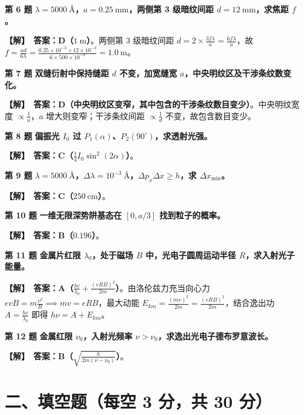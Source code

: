 \documentclass[zihao=5,a4paper,UTF8]{ctexart}
\newenvironment{prob}[2]{%
    \par\vspace{5pt}\noindent\textbf{\color{navy}#1} \textbf{#2}\par\nopagebreak\vspace{2pt}%
}{%
    \par\vspace{3pt}%
}
\newcommand{\sol}{\noindent\textbf{\color{tealaccent}【解】}\ }
\begin{document}
\begin{prob}{第 6 题}{$\lambda=5000\ \text{\AA}$，$a=0.25\ \mathrm{mm}$，两侧第 3 级暗纹间距 $d=12\ \mathrm{mm}$，求焦距 $f$。}
\sol \textbf{答案：D（$1\ \mathrm{m}$）}。两侧第 $3$ 级暗纹间距 $d = 2\times \frac{3f\lambda}{a} = \frac{6f\lambda}{a}$，故 $f = \frac{ad}{6\lambda} = \frac{0.25\times 10^{-3}\times 12\times 10^{-3}}{6\times 500\times 10^{-9}} = 1.0\ \mathrm{m}$。
\end{prob}

\begin{prob}{第 7 题}{双缝衍射中保持缝距 $d$ 不变，加宽缝宽 $a$，中央明纹区及干涉条纹数变化。}
\sol \textbf{答案：D（中央明纹区变窄，其中包含的干涉条纹数目变少）}。中央明纹宽度 $\propto \frac{1}{a}$，$a$ 增大则变窄；干涉条纹间距 $\propto \frac{1}{d}$ 不变，故包含数目变少。
\end{prob}

\begin{prob}{第 8 题}{偏振光 $I_0$ 过 $P_1(\alpha)$、$P_2(90^\circ)$，求透射光强。}
\sol \textbf{答案：C（$\frac{1}{4}I_0\sin^2(2\alpha)$）}。
\end{prob}

\begin{prob}{第 9 题}{$\lambda = 5000\ \text{\AA}$，$\Delta\lambda = 10^{-3}\ \text{\AA}$，$\Delta p_x \Delta x \ge h$，求 $\Delta x_{\min}$。}
\sol \textbf{答案：C（$250\ \mathrm{cm}$）}。
\end{prob}

\begin{prob}{第 10 题}{一维无限深势阱基态在 $[0, a/3]$ 找到粒子的概率。}
\sol \textbf{答案：B（$0.196$）}。
\end{prob}

\begin{prob}{第 11 题}{金属片红限 $\lambda_0$，处于磁场 $B$ 中，光电子圆周运动半径 $R$，求入射光子能量。}
\sol \textbf{答案：A（$\frac{hc}{\lambda_0} + \frac{(eRB)^2}{2m}$）}。由洛伦兹力充当向心力 $evB = m\frac{v^2}{R} \implies mv = eRB$，最大动能 $E_{km} = \frac{(mv)^2}{2m} = \frac{(eRB)^2}{2m}$，结合逸出功 $A = \frac{hc}{\lambda_0}$ 即得 $h\nu = A + E_{km}$。
\end{prob}

\begin{prob}{第 12 题}{金属红限 $\nu_0$，入射光频率 $\nu > \nu_0$，求逸出光电子德布罗意波长。}
\sol \textbf{答案：B（$\sqrt{\frac{h}{2m(\nu-\nu_0)}}$）}。
\end{prob}

\section*{二、填空题（每空 3 分，共 30 分）}
\end{document}
